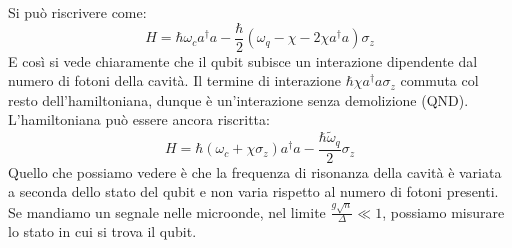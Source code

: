 Si può riscrivere come:
\begin{equation*}
    H=\hbar \omega_c a^\dagger a - \frac{\hbar}{2} (\omega_q - \chi  - 2\chi a^\dagger a) \sigma_z
\end{equation*}
E così si vede chiaramente che il qubit subisce un interazione dipendente dal numero di fotoni della cavità.
Il termine di interazione $ \hbar \chi a^\dagger a \sigma_z$ commuta col resto dell'hamiltoniana, dunque è un'interazione senza demolizione (QND). 
L'hamiltoniana può essere ancora riscritta:
\begin{equation*}
    H=\hbar (\omega_c+\chi\sigma_z) a^\dagger a - \frac{\hbar\tilde\omega_q}{2} \sigma_z 
\end{equation*}
Quello che possiamo vedere è che la frequenza di risonanza della cavità è variata a seconda dello stato del qubit e non varia rispetto al numero di fotoni presenti.
Se mandiamo un segnale nelle microonde, nel limite $\frac{g\sqrt{n}}{\Delta}\ll 1$, possiamo misurare lo stato in cui si trova il qubit.